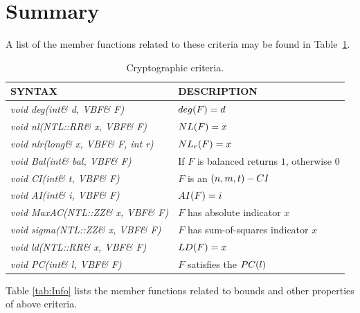 \section{Summary}

A list of the member functions related to these criteria may be found in Table~\ref{tab:Criteria}.

\begin{table}[htbp]
\caption{Cryptographic criteria.}
\centering
\label{tab:Criteria}
\begin{tabular}{ l l }
\toprule
SYNTAX & DESCRIPTION \\
\midrule
\textit{void deg(int\& d, VBF\& F)} & $\crit{deg}(F)=d$ \\
\textit{void nl(NTL::RR\& x, VBF\& F)} & $\crit{NL}(F)=x$ \\
\textit{void nlr(long\& x, VBF\& F, int r)} & $\crit{NL}_r(F)=x$ \\
\textit{void Bal(int\& bal, VBF\& F)} & If $F$ is balanced returns $1$, otherwise $0$ \\
\textit{void CI(int\& t, VBF\& F)} & $F$ is an $(n,m,t)-\crit{CI}$ \\
\textit{void AI(int\& i, VBF\& F)} & $\crit{AI}(F)=i$ \\
\textit{void MaxAC(NTL::ZZ\& x, VBF\& F)} & $F$ has absolute indicator $x$ \\
\textit{void sigma(NTL::ZZ\& x, VBF\& F)} & $F$ has sum-of-squares indicator $x$ \\
\textit{void ld(NTL::RR\& x, VBF\& F)} & $\crit{LD}(F)=x$ \\
\textit{void PC(int\& l, VBF\& F)} & $F$ satisfies the $\crit{PC}(l)$ \\
\bottomrule
\end{tabular}
\end{table}

Table \ref{tab:Info} lists the member functions related to bounds and other properties of above criteria.

